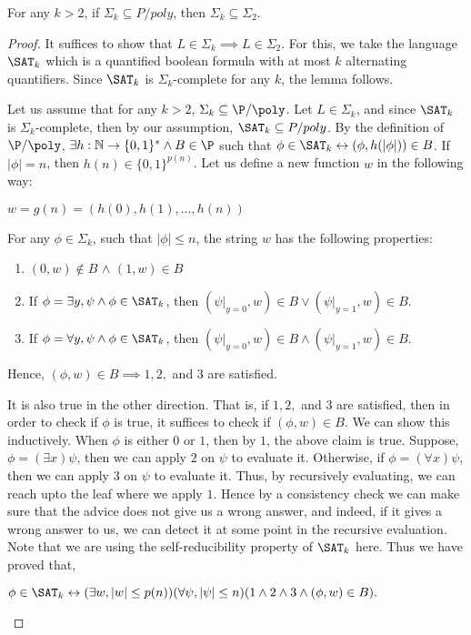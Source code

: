 \begin{lemma}
 For any $k > 2$, if $\Sigma_{k} \subseteq P/poly$, then $\Sigma_{k} \subseteq \Sigma_{2}$.
\end{lemma}
\begin{proof}
It suffices to show that $L \in \Sigma_{k} \implies L \in \Sigma_{2}$. For this, we take the
language $\SAT_{k}$ which is a quantified boolean formula with at most $k$ alternating
quantifiers. Since $\SAT_{k}$ is $\Sigma_{k}$-complete for any $k$, the lemma follows.

Let us assume that for any $k > 2$, $\Sigma_{k} \subseteq \P/\poly$. Let $L \in \Sigma_{k}$, and
since $\SAT_{k}$ is $\Sigma_{k}$-complete, then by our assumption, $\SAT_{k} \subseteq P/poly$. By
the definition of $\P/\poly$, $\exists h : \mathbb{N} \rightarrow \{0, 1\}^* \wedge B \in \P$ such that
$\phi \in \SAT_{k} \leftrightarrow (\phi, h(|\phi|)) \in B$. If $|\phi| = n$, then $h(n) \in \{0,
1\}^{p(n)}$. Let us define a new function $w$ in the following way:

\begin{center}
\begin{math}
 w = g(n) = (h(0), h(1), ..., h(n))
\end{math}
\end{center}
For any $\phi \in \Sigma_{k}$, such that $|\phi|
\leq n$, the string $w$ has the following properties:
\begin{enumerate}
\item $(0, w) \notin B$ $\wedge$ $(1, w) \in B$
\item If $\phi = \exists y, \psi \wedge \phi \in \SAT_{k}$, then $(\psi |_{y = 0}, w) \in B \vee
(\psi |_{y = 1}, w) \in B$.
\item If $\phi = \forall y, \psi \wedge \phi \in \SAT_{k}$, then $(\psi |_{y = 0}, w) \in B \wedge
(\psi |_{y = 1}, w) \in B$.
\end{enumerate}
Hence, $(\phi, w) \in B \implies 1, 2,$ and $3$ are satisfied.

It is also true in the other direction. That is, if $1, 2, $ and $3 $ are satisfied, then in order to check if $\phi$ is true, it suffices to check if $(\phi, w) \in B$. We can show this inductively. When $\phi$ is either $0$ or $1$, then by $1$, the above claim is true. Suppose, $\phi = (\exists x) \psi$, then we can apply $2$ on $\psi$ to evaluate it.
Otherwise, if $\phi = (\forall x) \psi$, then we can apply $3$ on $\psi$ to evaluate it. Thus, by recursively evaluating, we can reach upto the leaf where we apply $1$. Hence by a consistency check we can make sure that the advice does not give us a wrong answer, and indeed, if it gives a wrong answer to us, we can detect it at some point in the recursive evaluation. Note that we are using the self-reducibility property of $\SAT_k$ here.
Thus we have proved that,
\begin{center}
 \begin{math}
  \phi \in \SAT_{k} \leftrightarrow (\exists w, |w| \leq p(n)) (\forall \psi, |\psi| \leq n) (1
\wedge 2 \wedge 3 \wedge (\phi, w) \in B).
 \end{math}
\end{center}
\end{proof}

